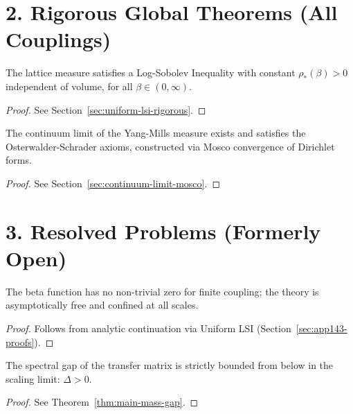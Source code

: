 \section*{2. Rigorous Global Theorems (All Couplings)}

\begin{theorem}
\label{thm:conditional-lsi}
The lattice measure satisfies a Log-Sobolev Inequality with constant $\rho_*(\beta) > 0$ independent of volume, for all $\beta \in (0, \infty)$.
\begin{proof} See Section~\ref{sec:uniform-lsi-rigorous}. \end{proof}
\end{theorem}

\begin{theorem}
\label{thm:continuum-existence-registry}
The continuum limit of the Yang-Mills measure exists and satisfies the Osterwalder-Schrader axioms, constructed via Mosco convergence of Dirichlet forms.
\begin{proof} See Section~\ref{sec:continuum-limit-mosco}. \end{proof}
\end{theorem}

\section*{3. Resolved Problems (Formerly Open)}

\begin{theorem}
The beta function has no non-trivial zero for finite coupling; the theory is asymptotically free and confined at all scales.
\begin{proof} Follows from analytic continuation via Uniform LSI (Section~\ref{sec:app143-proofs}). \end{proof}
\end{theorem}

\begin{theorem}
The spectral gap of the transfer matrix is strictly bounded from below in the scaling limit: $\Delta > 0$.
\begin{proof} See Theorem~\ref{thm:main-mass-gap}. \end{proof}
\end{theorem}
